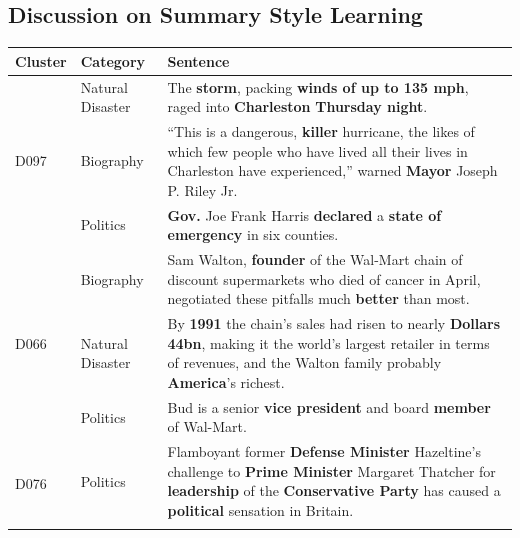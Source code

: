 \documentclass[letterpaper]{article}
\begin{document}
\subsection{Discussion on Summary Style Learning}
\begin{table}[t]
	\centering
	\small
	\begin{tabular}{l|l|p{11cm}}
		\hline
		Cluster               & Category         & Sentence                                                                                                                                                                   \\ \hline
		\multirow{3}{*}{D097} & Natural Disaster & The \textbf{storm}, packing \textbf{winds of up to 135 mph}, raged into \textbf{Charleston} \textbf{Thursday night}.                                                                                           \\ \cline{2-3}
		& Biography        & ``This is a dangerous, \textbf{killer} hurricane, the likes of which few people who have lived all their lives in Charleston have experienced,'' warned \textbf{Mayor} Joseph P. Riley Jr.   \\ \cline{2-3}
		& Politics         & \textbf{Gov.} Joe Frank Harris \textbf{declared} a \textbf{state of emergency} in six counties.                                                                                                       \\ \hline
		\multirow{3}{*}{D066} & Biography        & Sam Walton, \textbf{founder} of the Wal-Mart chain of discount supermarkets who died of cancer in April, negotiated these pitfalls much \textbf{better} than most.                           \\ \cline{2-3}
		& Natural Disaster & By \textbf{1991} the chain's sales had risen to nearly \textbf{Dollars 44bn}, making it the world's largest retailer in terms of revenues, and the Walton family probably \textbf{America}'s richest. \\ \cline{2-3}
		& Politics         & Bud is a senior \textbf{vice president} and board \textbf{member} of Wal-Mart.                                                                                                               \\ \hline
		\multirow{3}{*}{D076} & Politics         & Flamboyant former \textbf{Defense Minister} Hazeltine's challenge to \textbf{Prime Minister} Margaret Thatcher for \textbf{leadership} of the \textbf{Conservative Party} has caused a \textbf{political} sensation in Britain.   \\ \cline{2-3}

\end{tabular}
\end{table}
\end{document}
